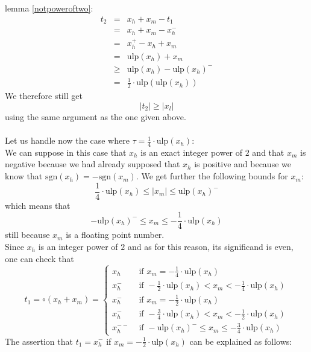 \documentclass[a4paper,10pt,twoside]{article}
\newenvironment{proof}[1][Proof]{\begin{trivlist}
\item[\hskip \labelsep {\bfseries #1}]}{\end{trivlist}}
\newcommand{\hi}{\ensuremath{\mathit{h}}}
\newcommand{\mi}{\ensuremath{\mathit{m}}}
\newcommand{\lo}{\ensuremath{\mathit{l}}}
\newcommand{\mUlp}{\ensuremath{\mathrm{ulp}}}
\newcommand{\sgn}{\ensuremath{\mathrm{sgn}}}
\begin{document}
\begin{proof}
lemma \ref{notpoweroftwo}:
\begin{eqnarray*}
t_2 & = & x_\hi + x_\mi - t_1 \\
& = & x_\hi + x_\mi - x_\hi^- \\
& = & x_\hi^+ - x_\hi + x_\mi \\
& = & \mUlp\left( x_\hi \right) + x_\mi \\
& \geq & \mUlp\left( x_\hi \right) - \mUlp\left( x_\hi \right)^- \\
& = & \frac{1}{2} \cdot \mUlp\left( \mUlp \left( x_\hi \right) \right)
\end{eqnarray*}
We therefore still get
$$\left \vert t_2 \right \vert \geq \left \vert x_\lo \right \vert$$
using the same argument as the one given above. \\ ~ \\
Let us handle now the case where $\tau = \frac{1}{4} \cdot \mUlp\left( x_\hi \right)$: \\
We can suppose in this case that $x_\hi$ is an exact integer power of $2$ and that $x_\mi$ is negative 
because we had already supposed that $x_\hi$ is positive and because we know that 
$\sgn\left( x_\hi \right) = -\sgn\left( x_\mi \right)$. We get further the following bounds for $x_\mi$:
$$\frac{1}{4} \cdot \mUlp\left( x_\hi \right) \leq \left \vert x_\mi \right \vert \leq \mUlp\left( x_\hi \right)^-$$
which means that
$$-\mUlp\left( x_\hi \right)^- \leq x_\mi \leq -\frac{1}{4} \cdot \mUlp\left( x_\hi \right)$$
still because $x_\mi$ is a floating point number. \\
Since $x_\hi$ is an integer power of $2$ and as for this reason, its significand is even, one can check that
$$t_1 = \circ \left( x_\hi + x_\mi \right) = \left \lbrace \begin{array}{ll} 
x_\hi & \mbox{ if } x_\mi = -\frac{1}{4} \cdot \mUlp\left( x_\hi \right) \\
x_\hi^- & \mbox{ if } -\frac{1}{2} \cdot \mUlp\left( x_\hi \right) < x_\mi < -\frac{1}{4} \cdot \mUlp\left( x_\hi \right) \\
x_\hi^- & \mbox{ if } x_\mi = -\frac{1}{2} \cdot \mUlp\left( x_\hi \right) \\
x_\hi^- & \mbox{ if } -\frac{3}{4} \cdot \mUlp\left( x_\hi \right) < x_\mi < -\frac{1}{2} \cdot \mUlp\left( x_\hi \right) \\
x_\hi^{--} & \mbox{ if } -\mUlp\left( x_\hi \right)^- \leq x_\mi \leq -\frac{3}{4} \cdot \mUlp\left( x_\hi \right)
\end{array} \right.
$$
The assertion that $t_1 = x_\hi^-$ if $x_\mi = -\frac{1}{2} \cdot \mUlp\left( x_\hi \right)$ can be explained as follows:\\

\end{proof}
\end{document}
